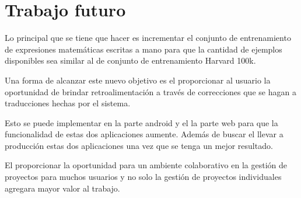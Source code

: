 \chapter{Trabajo futuro}

Lo principal que se tiene que hacer es incrementar el conjunto de entrenamiento de expresiones matemáticas escritas a mano para que la cantidad de ejemplos disponibles sea similar al de conjunto de entrenamiento Harvard 100k.

Una forma de alcanzar este nuevo objetivo es el proporcionar al usuario la oportunidad de brindar retroalimentación a través de correcciones que se hagan a traducciones hechas por el sistema.

Esto se puede implementar en la parte android y el la parte web para que la funcionalidad de estas dos aplicaciones aumente. Además de buscar el llevar a producción estas dos aplicaciones una vez que se tenga un mejor resultado.

El proporcionar la oportunidad para un ambiente colaborativo en la gestión de proyectos para muchos usuarios y no solo la gestión de proyectos individuales agregara mayor valor al trabajo.

